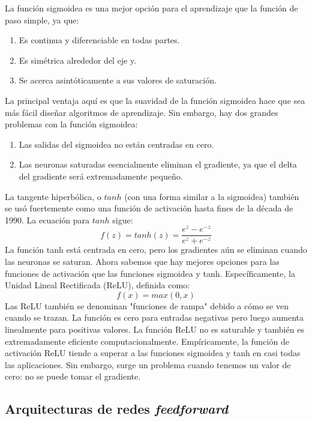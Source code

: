 \documentclass[a4paper,12pt]{article}
\begin{document}
La función sigmoidea es una mejor opción para el aprendizaje que la función de paso simple, ya que:
\begin{enumerate}[noitemsep, topsep=2pt]
	\item Es continua y diferenciable en todas partes.
	\item Es simétrica alrededor del eje y.
	\item Se acerca asintóticamente a sus valores de saturación.
\end{enumerate}
La principal ventaja aquí es que la suavidad de la función sigmoidea hace que sea más fácil diseñar algoritmos de aprendizaje. Sin embargo, hay dos grandes problemas con la función sigmoidea:
\begin{enumerate}[noitemsep, topsep=2pt]
	\item Las salidas del sigmoidea no están centradas en cero.
	\item Las neuronas saturadas esencialmente eliminan el gradiente, ya que el delta del gradiente será extremadamente pequeño.
\end{enumerate}

La tangente hiperbólica, o $tanh$ (con una forma similar a la sigmoidea) también se usó fuertemente como una función de activación hasta fines de la década de 1990.
La ecuación para $tanh$ sigue:
\begin{equation}
	f(z) = tanh(z) = \frac{e^z - e^{-z}}{e^z + e^{-z}}
\end{equation}
La función tanh está centrada en cero, pero los gradientes aún se eliminan cuando las neuronas se saturan.
Ahora sabemos que hay mejores opciones para las funciones de activación que las funciones sigmoidea y tanh. Específicamente, la Unidad Lineal Rectificada (ReLU), definida como:
\begin{equation}
	f(x) = max(0, x)
\end{equation}
Las ReLU también se denominan "funciones de rampa" debido a cómo se ven cuando se trazan. La función es cero para entradas negativas pero luego aumenta linealmente para positivas valores. La función ReLU no es saturable y también es extremadamente  eficiente computacionalmente.
Empíricamente, la función de activación ReLU tiende a superar a las funciones sigmoidea y tanh en casi todas las aplicaciones. Sin embargo, surge un problema cuando tenemos un valor de cero: no se puede tomar el gradiente.

\clearpage

\subsection{Arquitecturas de redes \textit{feedforward}}
\end{document}
